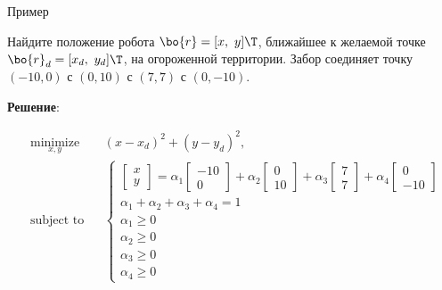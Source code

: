\documentclass{beamer}
\begin{document}
\begin{frame}{Пример}
	\begin{flushleft}
		
		Найдите положение робота $\bo{r} = [x, \ y]\T$, ближайшее к желаемой точке $\bo{r}_d= [x_d, \ y_d]\T$, на огороженной территории. Забор соединяет точку $(-10, 0)$ с $(0, 10)$ с $(7, 7)$ с $(0, -10)$.
		
		\bigskip
		
		\textbf{Решение}:
		
		\begin{equation}
			\begin{aligned}
				& \underset{x, y}{\text{minimize}}
				& & (x-x_d)^2 + (y-y_d)^2, \\
				& \text{subject to}
				& & 
				\begin{cases}
					\begin{bmatrix} x \\y \end{bmatrix}
					=
					\alpha_1
					\begin{bmatrix} -10 \\0 \end{bmatrix}
					+
					\alpha_2
					\begin{bmatrix} 0 \\10 \end{bmatrix}
					+
					\alpha_3
					\begin{bmatrix} 7 \\7 \end{bmatrix}
					+
					\alpha_4
					\begin{bmatrix} 0 \\ -10 \end{bmatrix}
					\\
					\alpha_1 + \alpha_2 + \alpha_3 + \alpha_4 = 1
					\\
					\alpha_1 \geq 0 \\  \alpha_2 \geq 0 \\  \alpha_3 \geq 0 \\  \alpha_4 \geq 0
				\end{cases}
			\end{aligned}
		\end{equation}
		
	\end{flushleft}
\end{frame}
\end{document}
